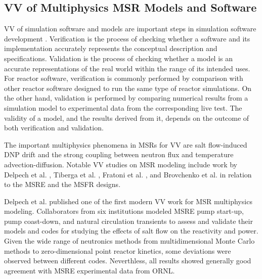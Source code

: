 \subsection{\gls{VV} of Multiphysics \gls{MSR} Models and Software}

\gls{VV} of simulation software and models are important steps in simulation software development
\cite{sargent_verification_2010}. Verification is the process of checking whether a software
and its implementation accurately represents the conceptual description and specifications.
Validation is the process of checking whether a model is an accurate representations of the real
world within the range of its intended uses. For reactor software, verification is commonly
performed by comparison with other reactor software designed to run the same type of reactor
simulations. On the other hand, validation is performed by comparing numerical results from
a simulation model to experimental data from the corresponding live test. The validity of a model,
and the results derived from it, depends on the outcome of both verification and validation.

The important multiphysics phenomena in \glspl{MSR} for \gls{VV} are salt flow-induced
\gls{DNP} drift and the strong coupling between neutron flux and temperature advection-diffusion.
Notable \gls{VV} studies on \gls{MSR} modeling include work by Delpech et al.
\cite{delpech_benchmark_2003}, Tiberga et al. \cite{tiberga_results_2020}, Fratoni et al.
\cite{fratoni_molten_2020}, and Brovchenko et al. \cite{brovchenko_neutronic_2019} in relation to
the \gls{MSRE} and the \gls{MSFR} designs.



Delpech et al. \cite{delpech_benchmark_2003}
published one of the first modern \gls{VV} work for \gls{MSR} multiphysics modeling. Collaborators
from six institutions modeled \gls{MSRE} pump start-up, pump coast-down, and natural
circulation transients to assess and validate their models and codes for studying the effects of
salt flow on the reactivity and power. Given the wide range of neutronics methods from
multidimensional Monte Carlo methods to zero-dimensional point reactor kinetics, some deviations
were observed between different codes. Neverthless, all results showed generally good agreement
with \gls{MSRE} experimental data from \gls{ORNL}.

